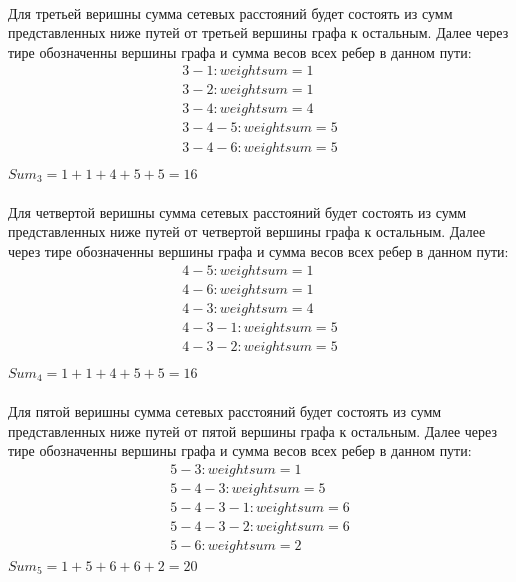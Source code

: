 \documentclass[12pt]{article}
\begin{document}
\paragraph{}

Для третьей веришны сумма сетевых расстояний будет состоять из сумм представленных ниже 
путей от третьей вершины графа к остальным.
Далее через тире обозначенны вершины графа и сумма весов всех ребер в данном пути:
\begin{gather}
3 - 1 : weight sum = 1 \\
3 - 2 : weight sum = 1 \\
3 - 4 : weight sum = 4 \\
3 - 4 - 5 : weight sum = 5 \\
3 - 4 - 6 : weight sum = 5 \\
\end{gather}
$Sum_3 = 1 + 1 + 4 + 5 + 5 = 16$

\paragraph{}

Для четвертой веришны сумма сетевых расстояний будет состоять из сумм представленных ниже 
путей от четвертой вершины графа к остальным.
Далее через тире обозначенны вершины графа и сумма весов всех ребер в данном пути:
\begin{gather}
4 - 5 : weight sum = 1 \\
4 - 6 : weight sum = 1 \\
4 - 3 : weight sum = 4 \\
4 - 3 - 1 : weight sum = 5 \\
4 - 3 - 2 : weight sum = 5 \\
\end{gather}
$Sum_4 = 1 + 1 + 4 + 5 + 5 = 16$

\paragraph{}

Для пятой веришны сумма сетевых расстояний будет состоять из сумм представленных ниже 
путей от пятой вершины графа к остальным.
Далее через тире обозначенны вершины графа и сумма весов всех ребер в данном пути:
\begin{gather}
5 - 3 : weight sum = 1 \\
5 - 4 - 3 : weight sum = 5 \\
5 - 4 - 3 - 1 : weight sum = 6 \\
5 - 4 - 3 - 2 : weight sum = 6 \\
5 - 6 : weight sum = 2
\end{gather}
$Sum_5 = 1 + 5 + 6 + 6 + 2 = 20$
\end{document}
